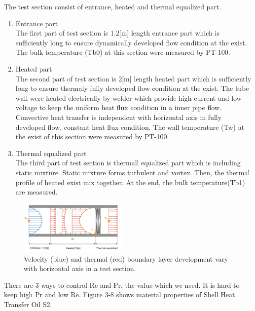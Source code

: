\documentclass[conference]{IEEEtran}
\begin{document}
The test section consist of entrance, heated and thermal equalized part.
\begin{enumerate}
  \item Entrance part\\
  The first part of test section is 1.2[m] length entrance part which is sufficiently long to ensure dynamically developed flow condition at the exist.
  The bulk temperature (Tb0) at this section were measured by PT-100.
  \item Heated part\\
  The second part of test section is 2[m] length heated part which is sufficiently long to ensure thermaly fully developed flow condition at the exist.
  The tube wall were heated electrically by welder which provide high current and low voltage to keep the uniform heat flux condition in a inner pipe flow. 
  Convective heat transfer is independent with horizontal axis in fully developed flow, constant heat flux condition.
  The wall temperature (Tw) at the exist of this section were measured by PT-100.
  \item Thermal equalized part\\
  The third part of test section is thermall equalized part which is including static mixture. Static mixture forms turbulent and vortex. Then, the thermal profile of heated exist mix together. At the end, the bulk temperature(Tb1) are measured.
\end{enumerate}


\begin{figure}[htbp]
  \centering
\includegraphics[width=0.47\textwidth,natwidth=850,natheight=450]{fig/thermal_boundary_layer_development.png}
  \caption{Velocity (blue) and thermal (red) boundary layer development vary with horizontal axis in a test section.}
  \label{thermal_boundary_layer_development}
\end{figure}

There are 3 ways to control Re and Pr, the value which we need.
It is hard to keep high Pr and low Re.
Figure 3-8 shows material properties of Shell Heat Transfer Oil S2.
\end{document}
